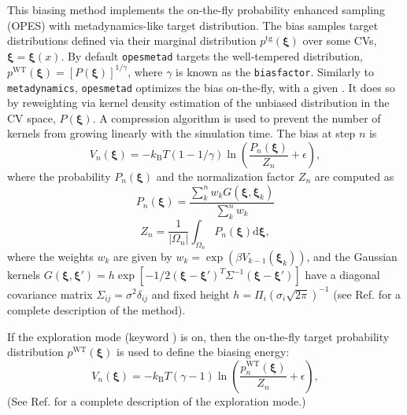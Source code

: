 
This biasing method implements the on-the-fly probability enhanced sampling (OPES) with metadynamics-like target distribution.\cite{Invernizzi2020}
The bias samples target distributions defined via their marginal distribution
$p^{\mathrm{tg}}(\boldsymbol{\xi})$ over some CVs, $\boldsymbol{\xi} = \boldsymbol{\xi}(x)$.
By default \texttt{opes{\textunderscore}metad} targets the well-tempered distribution, $p^{\mathrm{WT}}(\boldsymbol{\xi}) = [P(\boldsymbol{\xi})]^{1/\gamma}$, where $\gamma$ is known as the \texttt{biasfactor}.
Similarly to \texttt{metadynamics}, \texttt{opes{\textunderscore}metad} optimizes the bias on-the-fly, with a given .
It does so by reweighting via kernel density estimation of the unbiased distribution in the CV space, $P(\boldsymbol{\xi})$.
A compression algorithm is used to prevent the number of kernels from growing linearly with the simulation time.
The bias at step $n$ is
\begin{equation}\label{eq:opes_potential}
V_n\left(\boldsymbol{\xi}\right) = -k_{\mathrm{B}}T\left(1-1/\gamma\right)\ln\left(\frac{P_n(\boldsymbol{\xi})}{Z_n}+\epsilon\right),
\end{equation}
where the probability $P_n \left(\boldsymbol{\xi}\right)$ and the normalization factor $Z_n$ are computed as
\begin{equation}
P_n (\boldsymbol{\xi}) = \frac{\sum_k^n w_k G(\boldsymbol{\xi}, \boldsymbol{\xi}_k)}{\sum_k^n w_k}
\end{equation}
\begin{equation}
Z_n = \frac{1}{|\Omega_n|}\int_{\Omega_n} P_n \left(\boldsymbol{\xi}\right) \mathrm{d}\boldsymbol{\xi},
\end{equation}
where the weights $w_k$ are given by $w_k = \exp(\beta V_{k-1}(\boldsymbol{\xi}_k))$, and the Gaussian kernels
$G\left(\boldsymbol{\xi}, \boldsymbol{\xi}'\right) = h\exp\left[-1/2\left(\boldsymbol{\xi}-\boldsymbol{\xi}'\right)^T \Sigma^{-1}\left(\boldsymbol{\xi}-\boldsymbol{\xi}'\right)\right]$ have a diagonal covariance matrix $\Sigma_{ij}=\sigma^2 \delta_{ij}$ and fixed height $h=\Pi_i (\sigma_i \sqrt{2\pi})^{-1}$ (see Ref.\cite{Invernizzi2020} for a complete description of the method).

If the exploration mode (keyword ) is on, then the on-the-fly target probability distribution $p^{\mathrm{WT}}(\boldsymbol{\xi})$ is used to define the biasing energy:
\begin{equation}\label{eq:opes_potential_explore}
V_n \left(\boldsymbol{\xi}\right)=-k_{\mathrm{B}} T\left(\gamma - 1\right)\ln{\left(\frac{p_n^{\mathrm{WT}}(\boldsymbol{\xi})}{Z_n}+\epsilon\right)},
\end{equation}
(See Ref.\cite{Invernizzi2022} for a complete description of the exploration mode.)

